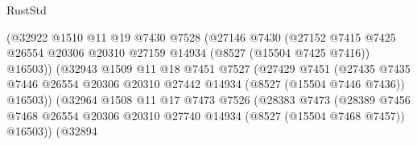\begin{lexlean}{RustStd}
\begin{coremodule}
                                  (@32922
                                    @1510
                                    @11
                                    @19
                                    @7430
                                    @7528
                                    (@27146
                                      @7430
                                      (@27152
                                        @7415
                                        @7425
                                        @26554
                                        @20306
                                        @20310
                                        @27159
                                        @14934
                                        (@8527 (@15504 @7425 @7416))
                                        @16503))
                                    (@32943
                                      @1509
                                      @11
                                      @18
                                      @7451
                                      @7527
                                      (@27429
                                        @7451
                                        (@27435
                                          @7435
                                          @7446
                                          @26554
                                          @20306
                                          @20310
                                          @27442
                                          @14934
                                          (@8527 (@15504 @7446 @7436))
                                          @16503))
                                      (@32964
                                        @1508
                                        @11
                                        @17
                                        @7473
                                        @7526
                                        (@28383
                                          @7473
                                          (@28389
                                            @7456
                                            @7468
                                            @26554
                                            @20306
                                            @20310
                                            @27740
                                            @14934
                                            (@8527 (@15504 @7468 @7457))
                                            @16503))
                                        (@32894

\end{coremodule}
\end{lexlean}
